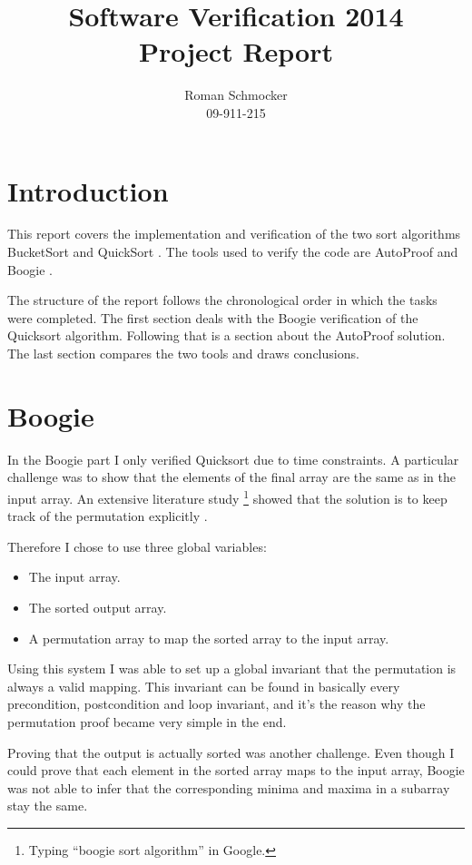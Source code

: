\documentclass[a4paper,10pt]{article}
\title{Software Verification 2014 \\ Project Report}
\author{Roman Schmocker \\ 09-911-215}
\begin{document}
\maketitle


\section{Introduction}
This report covers the implementation and verification of the two sort algorithms BucketSort \cite{web:bucketsort} and QuickSort \cite{web:quicksort}.
The tools used to verify the code are AutoProof \cite{web:autoproof} and Boogie \cite{paper:boogie, web:boogie}.

The structure of the report follows the chronological order in which the tasks were completed.
The first section deals with the Boogie verification of the Quicksort algorithm.
Following that is a section about the AutoProof solution.
The last section compares the two tools and draws conclusions.

\section {Boogie}

In the Boogie part I only verified Quicksort due to time constraints.
A particular challenge was to show that the elements of the final array are the same as in the input array.
An extensive literature study \footnote{Typing ``boogie sort algorithm'' in Google.} showed that the solution is to 
keep track of the permutation explicitly \cite{web:boogie:bubblesort}.

Therefore I chose to use three global variables:
\begin{itemize}
 \item The input array.
 \item The sorted output array.
 \item A permutation array to map the sorted array to the input array.
\end{itemize}

Using this system I was able to set up a global invariant that the permutation is always a valid mapping.
This invariant can be found in basically every precondition, postcondition and loop invariant, and it's the reason why the permutation proof became very simple in the end.

Proving that the output is actually sorted was another challenge.
Even though I could prove that each element in the sorted array maps to the input array,
Boogie was not able to infer that the corresponding minima and maxima in a subarray stay the same.
\end{document}
